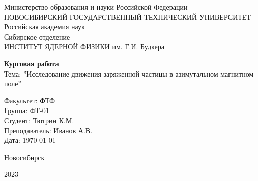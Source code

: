\begin{titlepage}
	\begin{center} 
                Министерство образования и науки Российской Федерации\\[12pt]
		
				НОВОСИБИРСКИЙ ГОСУДАРСТВЕННЫЙ ТЕХНИЧЕСКИЙ УНИВЕРСИТЕТ\normalsize
		\\[12pt]
		Российская академия наук \\[12pt]
                Сибирское отделение \\[12pt]
                ИНСТИТУТ ЯДЕРНОЙ ФИЗИКИ им. Г.И. Будкера \\[12pt]
                
		
		\vspace{42pt}
		
		\large\textbf{Курсовая работа}\\[12pt]
		
		\normalsize Тема: ''Исследование движения заряженной частицы в азимутальном магнитном поле''\\[12pt]
        
		



        \vspace{5cm}

	
		
	\end{center}
	

     

\begin{flushleft}\normalsize
        Факультет: ФТФ \\
        Группа: ФТ-01 \\
        Студент: Тютрин К.М. \\
        Преподаватель: Иванов А.В.\\
        Дата: \today
\end{flushleft}








 
	\begin{center}
		\vspace{\fill}
		Новосибирск
		
		2023
	\end{center}
\end{titlepage}
